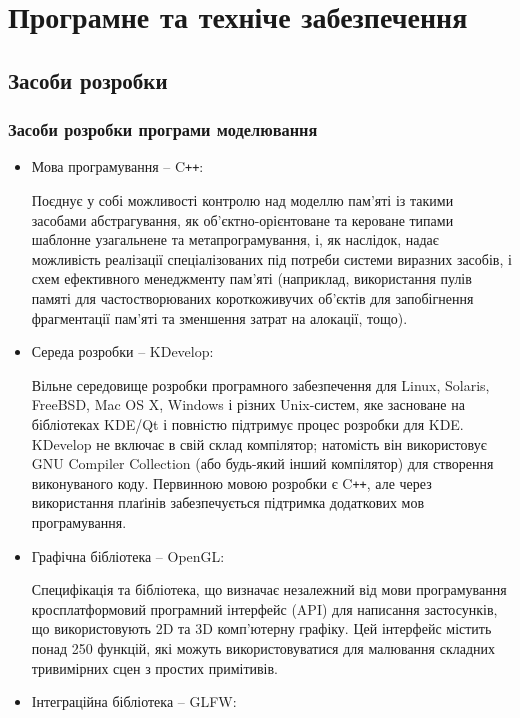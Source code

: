 \section{Програмне та техніче забезпечення}
\subsection{Засоби розробки}
\subsubsection{Засоби розробки програми моделювання}
\begin{itemize}[label=\Large$\diamond$]\itemsep1em
  \item Мова програмування -- C\verb!++!:

    Поєднує у собі можливості контролю над моделлю пам'яті із такими засобами абстрагування, як об'єктно-орієнтоване та кероване типами шаблонне узагальнене та метапрограмування, і, як наслідок, надає можливість реалізації спеціалізованих під потреби системи виразних засобів, і схем ефективного менеджменту пам'яті (наприклад, використання пулів памяті для частостворюваних короткоживучих об'єктів для запобігнення фрагментації пам'яті та зменшення затрат на алокації, тощо).

  \item Середа розробки -- KDevelop:

    Вільне середовище розробки програмного забезпечення для Linux, Solaris, FreeBSD, Mac OS X, Windows і різних Unix-систем, яке засноване на бібліотеках KDE/Qt і повністю підтримує процес розробки для KDE. KDevelop не включає в свій склад компілятор; натомість він використовує GNU Compiler Collection (або будь-який інший компілятор) для створення виконуваного коду. Первинною мовою розробки є C\verb!++!, але через використання плаґінів забезпечується підтримка додаткових мов програмування.

  \item Графічна бібліотека -- OpenGL:

    Специфікація та бібліотека, що визначає незалежний від мови програмування кросплатформовий програмний інтерфейс (API) для написання застосунків, що використовують 2D та 3D комп'ютерну графіку. Цей інтерфейс містить понад 250 функцій, які можуть використовуватися для малювання складних тривимірних сцен з простих примітивів.

  \item Інтеграційна бібліотека -- GLFW:


\end{itemize}
